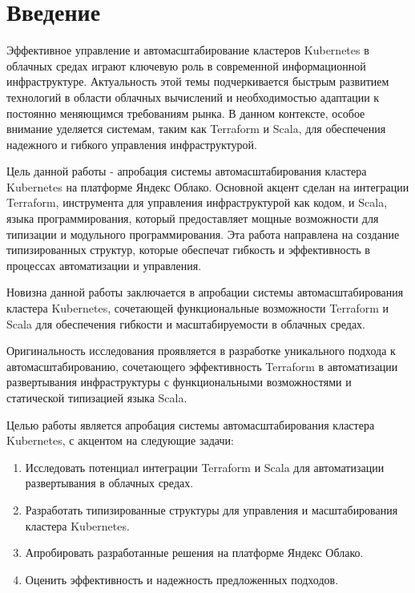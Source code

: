 \chapter*{Введение}
\label{sec:afterwords}

Эффективное управление и автомасштабирование кластеров Kubernetes в облачных
средах играют ключевую роль в современной информационной инфраструктуре.
Актуальность этой темы подчеркивается быстрым развитием технологий в области
облачных вычислений и необходимостью адаптации к постоянно меняющимся
требованиям рынка. В данном контексте, особое внимание уделяется системам, таким
как Terraform и Scala, для обеспечения надежного и гибкого управления
инфраструктурой.

Цель данной работы - апробация системы автомасштабирования кластера Kubernetes
на платформе Яндекс Облако. Основной акцент сделан на интеграции
Terraform, инструмента для управления инфраструктурой как кодом, и Scala, языка
программирования, который предоставляет мощные возможности для типизации и
модульного программирования. Эта работа направлена на создание типизированных
структур, которые обеспечат гибкость и эффективность в процессах автоматизации и
управления.


Новизна данной работы заключается в апробации системы автомасштабирования
кластера Kubernetes, сочетающей функциональные возможности Terraform и Scala для
обеспечения гибкости и масштабируемости в облачных средах.

Оригинальность исследования проявляется в разработке уникального подхода к
автомасштабированию, сочетающего эффективность Terraform в автоматизации
развертывания инфраструктуры с функциональными возможностями и статической
типизацией языка Scala.

Целью работы является апробация системы автомасштабирования кластера Kubernetes,
с акцентом на следующие задачи:

\begin{enumerate}
        \item Исследовать потенциал интеграции Terraform и Scala для
автоматизации развертывания в облачных средах.
        \item Разработать типизированные структуры для управления и
масштабирования кластера Kubernetes.
	\item Апробировать разработанные решения на платформе Яндекс Облако.
	\item Оценить эффективность и надежность предложенных подходов.
\end{enumerate}


